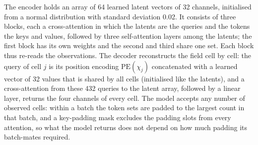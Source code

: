 \documentclass[english, 12pt, a4paper, elec, utf8, a-2b, online]{aaltothesis}
\begin{document}
The encoder holds an array of 64 learned latent vectors of 32 channels,
initialised from a normal distribution with standard deviation 0.02. It
consists of three blocks, each a cross-attention in which the latents are the
queries and the tokens the keys and values, followed by three self-attention
layers among the latents; the first block has its own weights and the second and
third share one set. Each block thus re-reads the observations. The decoder
reconstructs the field cell by cell: the query of cell $j$ is its position
encoding $\mathrm{PE}(\chi_j)$ concatenated with a learned vector of 32 values
that is shared by all cells (initialised like the latents), and a
cross-attention from these 432 queries to the latent array, followed by a linear
layer, returns the four channels of every cell. The model accepts any number of
observed cells: within a batch the token sets are padded to the largest count in
that batch, and a key-padding mask excludes the padding slots from every
attention, so what the model returns does not depend on how much padding its
batch-mates required.
\end{document}
